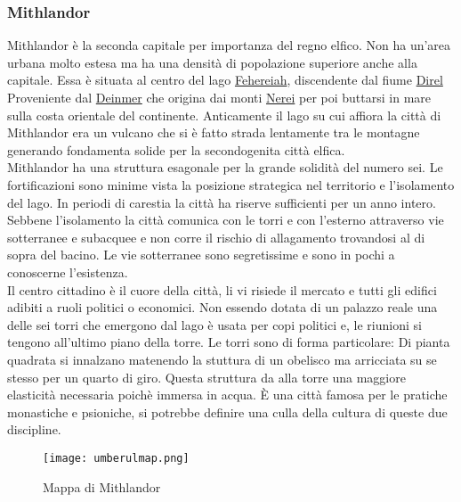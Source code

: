 
\subsubsection{Mithlandor}\label{cyt:mithlandor}
Mithlandor \`e la seconda capitale per importanza del regno elfico. Non ha
un'area urbana molto estesa ma ha una densit\`a di popolazione superiore anche alla
capitale. Essa \`e situata al centro del lago \hyperref[loc:fehereiah]{Fehereiah}, discendente dal fiume
\hyperref[loc:direl]{Direl} Proveniente dal \hyperref[loc:deinmer]{Deinmer} che origina dai monti
\hyperref[loc:nerei]{Nerei} per poi buttarsi in mare sulla costa orientale del continente.
Anticamente il lago su cui affiora la citt\`a di Mithlandor era un vulcano che
si \`e fatto strada lentamente tra le montagne generando fondamenta solide per la
secondogenita citt\`a elfica.\\
Mithlandor ha una struttura esagonale per la grande solidit\`a del numero sei. Le fortificazioni
sono minime vista la posizione strategica nel territorio e l'isolamento del lago. In periodi
di carestia la citt\`a ha riserve sufficienti per un anno intero. Sebbene l'isolamento la
citt\`a comunica con le torri e con l'esterno attraverso vie sotterranee e subacquee e non corre il
rischio di allagamento trovandosi al di sopra del bacino. Le vie sotterranee sono segretissime e sono in
pochi a conoscerne l'esistenza.\\
Il centro cittadino \`e il cuore della citt\`a, li vi risiede il mercato e tutti gli edifici adibiti
a ruoli politici o economici.
Non essendo dotata di un palazzo reale una delle sei torri che emergono dal lago \`e usata per copi politici
e, le riunioni si tengono all'ultimo piano della torre. Le torri sono di forma particolare:
Di pianta quadrata si innalzano matenendo la stuttura di un obelisco ma arricciata su se stesso
per un quarto di giro. Questa struttura da alla torre una maggiore elasticit\`a necessaria
poich\`e immersa in acqua.
\`E una citt\`a famosa per le pratiche monastiche e psioniche, si potrebbe definire
una culla della cultura di queste due discipline.\\
\begin{figure}[h]
  \centering
  \texttt{[image: umberulmap.png]}
  \caption{Mappa di Mithlandor}
\end{figure}